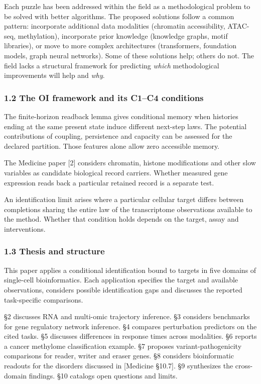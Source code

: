 \documentclass[
]{article}
\begin{document}
Each puzzle has been addressed within the field as a methodological
problem to be solved with better algorithms. The proposed solutions
follow a common pattern: incorporate additional data modalities
(chromatin accessibility, ATAC-seq, methylation), incorporate prior
knowledge (knowledge graphs, motif libraries), or move to more complex
architectures (transformers, foundation models, graph neural networks).
Some of these solutions help; others do not. The field lacks a
structural framework for predicting \emph{which} methodological
improvements will help and \emph{why}.

\hypertarget{the-oi-framework-and-its-c1c4-conditions}{%
\subsubsection{1.2 The OI framework and its C1--C4
conditions}\label{the-oi-framework-and-its-c1c4-conditions}}

The finite-horizon readback lemma gives conditional memory when
histories ending at the same present state induce different next-step
laws. The potential contributions of coupling, persistence and capacity
can be assessed for the declared partition. Those features alone allow
zero accessible memory.

The Medicine paper {[}2{]} considers chromatin, histone modifications
and other slow variables as candidate biological record carriers.
Whether measured gene expression reads back a particular retained record
is a separate test.

An identification limit arises where a particular cellular target
differs between completions sharing the entire law of the transcriptome
observations available to the method. Whether that condition holds
depends on the target, assay and interventions.

\hypertarget{thesis-and-structure}{%
\subsubsection{1.3 Thesis and structure}\label{thesis-and-structure}}

This paper applies a conditional identification bound to targets in five
domains of single-cell bioinformatics. Each application specifies the
target and available observations, considers possible identification
gaps and discusses the reported task-specific comparisons.

§2 discusses RNA and multi-omic trajectory inference. §3 considers
benchmarks for gene regulatory network inference. §4 compares
perturbation predictors on the cited tasks. §5 discusses differences in
response times across modalities. §6 reports a cancer methylome
classification example. §7 proposes variant-pathogenicity comparisons
for reader, writer and eraser genes. §8 considers bioinformatic readouts
for the disorders discussed in {[}Medicine §10.7{]}. §9 synthesizes the
cross-domain findings. §10 catalogs open questions and limits.
\end{document}
